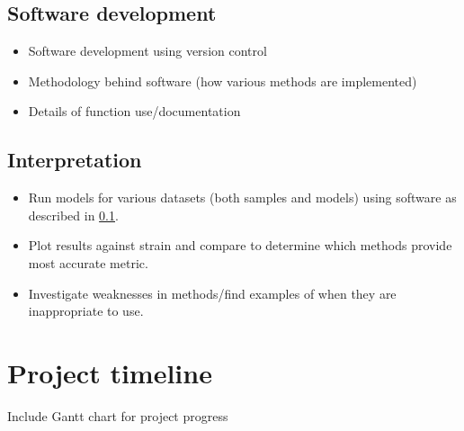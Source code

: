 \documentclass[]{article}
\numberwithin{equation}{section}
\begin{document}
\subsection{Software development} \label{software}


\begin{itemize}
  \item Software development using version control \citep{Walker}
  \item Methodology behind software (how various methods are implemented) 
  \item Details of function use/documentation 
\end{itemize}

\subsection{Interpretation}

\begin{itemize}
  \item Run models for various datasets (both samples and models) using software as described in \ref{software}.
  \item Plot results against strain and compare to determine which methods provide most accurate metric. 
  \item Investigate weaknesses in methods/find examples of when they are inappropriate to use.
\end{itemize}

\section{Project timeline}
Include Gantt chart for project progress



\end{document}
